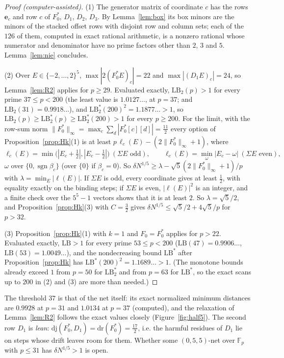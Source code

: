 \documentclass[11pt]{amsart}
\theoremstyle{definition}
\theoremstyle{plain}
\newcommand{\F}{\mathbb{F}}
\newcommand{\e}{\mathbf{e}}
\begin{document}
\begin{proof}[Proof (computer-assisted)]
(1) The generator matrix of coordinate $c$ has the rows $\e_c$ and row $c$ of $F_0^*$, $D_1$, $D_2$, $D_3$. By Lemma~\ref{lem:box} its box minors are the minors of the stacked offset rows with disjoint row and column sets; each of the $126$ of them, computed in exact rational arithmetic, is a nonzero rational whose numerator and denominator have no prime factors other than $2$, $3$ and $5$. Lemma~\ref{lem:nie} concludes.

(2) Over $E\in\{-2,\dots,2\}^5$, $\max|2(F_0^*E)_c|=22$ and $\max|(D_1E)_c|=24$, so Lemma~\ref{lem:R2} applies for $p\ge29$. Evaluated exactly, $\mathrm{LB}_2(p)>1$ for every prime $37\le p<200$ (the least value is $1.0127\ldots$, at $p=37$; and $\mathrm{LB}_2(31)=0.9918\ldots$), and $\mathrm{LB}_2^*(200)^2=1.1877\ldots>1$, so $\mathrm{LB}_2(p)\ge\mathrm{LB}_2^*(p)\ge\mathrm{LB}_2^*(200)>1$ for every $p\ge200$. For the limit, with the row-sum norm $\|F_0^*\|_\infty=\max_c\sum_d|F_0^*[c][d]|=\frac{11}2$ every option of Proposition~\ref{prop:Hk}(1) is at least $p\,\ell_c(E)-(2\|F_0^*\|_\infty+1)$, where
\[
\ell_c(E)=\min\bigl(|E_c+\tfrac12|,|E_c-\tfrac12|\bigr)\ (\Sigma E\text{ odd}),\qquad\ell_c(E)=\min_{\omega}|E_c-\omega|\ (\Sigma E\text{ even}),
\]
$\omega$ over $\{0,\operatorname{sgn}\beta_c\}$ (over $\{0\}$ if $\beta_c=0$). So $\delta N^{1/5}\ge\lambda-\sqrt5(2\|F_0^*\|_\infty+1)/p$ with $\lambda=\min_E|\ell(E)|$. If $\Sigma E$ is odd, every coordinate gives at least $\frac12$, with equality exactly on the binding steps; if $\Sigma E$ is even, $|\ell(E)|^2$ is an integer, and a finite check over the $5^5-1$ vectors shows that it is at least $2$. So $\lambda=\sqrt5/2$, and Proposition~\ref{prop:Hk}(3) with $C=\frac32$ gives $\delta N^{1/5}\le\sqrt5/2+4\sqrt5/p$ for $p>32$.

(3) Proposition~\ref{prop:Hk}(1) with $k=1$ and $F_0=F_0^*$ applies for $p>22$. Evaluated exactly, $\mathrm{LB}>1$ for every prime $53\le p<200$ ($\mathrm{LB}(47)=0.9906\ldots$, $\mathrm{LB}(53)=1.0049\ldots$), and the nondecreasing bound $\mathrm{LB}^*$ after Proposition~\ref{prop:Hk} has $\mathrm{LB}^*(200)^2=1.1689\ldots>1$. (The monotone bounds already exceed $1$ from $p=50$ for $\mathrm{LB}_2^*$ and from $p=63$ for $\mathrm{LB}^*$, so the exact scans up to $200$ in (2) and (3) are more than needed.)
\end{proof}

The threshold $37$ is that of the net itself: its exact normalized minimum distances are $0.9928$ at $p=31$ and $1.0134$ at $p=37$ (computed), and the relaxation of Lemma~\ref{lem:R2} follows the exact values closely (Figure~\ref{fig:half5}). The second row $D_1$ is \emph{lean}: $\mathrm{dj}(F_0^*,D_1)=\mathrm{dr}(F_0^*)=\frac{17}2$, i.e. the harmful residues of $D_1$ lie on steps whose drift leaves room for them. Whether some $(0,5,5)$-net over $\F_p$ with $p\le31$ has $\delta N^{1/5}>1$ is open.
\end{document}
